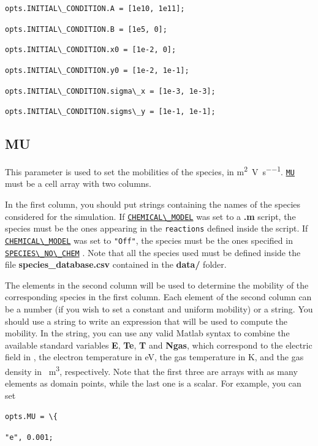 \documentclass[12pt,a4paper]{article}
\newcommand{\matlabs}[1]{{\lstinline[style=MatlabStyle]!#1!}}
\newcommand{\seclink}[2]{%
	\begingroup
	\hypersetup{linkcolor=orange}%
	\hyperref[sec:#1]{\matlabs{#2}}%
	\endgroup
}
\begin{document}
	\matlabs{opts.INITIAL\_CONDITION.A = [1e10, 1e11];}
	
	\matlabs{opts.INITIAL\_CONDITION.B = [1e5, 0];}
	
	\matlabs{opts.INITIAL\_CONDITION.x0 = [1e-2, 0];}
	
	\matlabs{opts.INITIAL\_CONDITION.y0 = [1e-2, 1e-1];}
	
	\matlabs{opts.INITIAL\_CONDITION.sigma\_x = [1e-3, 1e-3];}
	
	\matlabs{opts.INITIAL\_CONDITION.sigms\_y = [1e-1, 1e-1];}
	
	\subsection{MU}
	\label{sec:mu}
	This parameter is used to set the mobilities of the species, in \unit{\square\meter\per\volt\per\second}. \seclink{mu}{MU} must be a cell array with two columns.
	
	In the first column, you should put strings containing the names of the species considered for the simulation. If \seclink{chemicalmodel}{CHEMICAL\_MODEL} was set to a \textbf{.m} script, the species must be the ones appearing in the \matlabs{reactions} defined inside the script.
	If \seclink{chemicalmodel}{CHEMICAL\_MODEL} was set to \matlabs{"Off"}, the species must be the ones specified in \seclink{speciesnochem}{SPECIES\_NO\_CHEM}. Note that all the species used must be defined inside the file \textbf{species\_database.csv} contained in the \textbf{data/} folder.
	
	The elements in the second column will be used to determine the mobility of the corresponding species in the first column. Each element of the second column can be a number (if you wish to set a constant and uniform mobility) or a string. You should use a string to write an expression that will be used to compute the mobility.
	In the string, you can use any valid Matlab syntax to combine the available standard variables \textbf{E}, \textbf{Te}, \textbf{T} and \textbf{Ngas}, which correspond to the electric field in \unit{\Td}, the electron temperature in \unit{\electronvolt}, the gas temperature in K, and the gas density in \unit{\per\cubic\meter}, respectively. Note that the first three are arrays with as many elements as domain points, while the last one is a scalar. For example, you can set
	
	\matlabs{opts.MU = \{}
	
	\hspace{40pt} \matlabs{"e", 0.001;}
	
\end{document}
